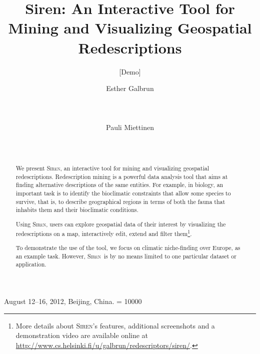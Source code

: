 \documentclass{sig-alternate}
\newcommand{\Siren}{\textsc{Siren}}
\begin{document}
 {August 12--16, 2012, Beijing, China.}
\widowpenalty = 10000
\setlength{\pdfpageheight}{11in}%
\setlength{\pdfpagewidth}{8.5in}%


\title{Siren: An Interactive Tool for Mining and Visualizing Geospatial Redescriptions}
\subtitle{[Demo]}

\author{
\alignauthor
Esther Galbrun\\
       \\
       \\
       \\
\alignauthor
Pauli Miettinen\\
       \\
       \\
}
 
\maketitle
\begin{abstract}
  We present \Siren, an interactive tool for mining and visualizing
  geospatial redescriptions.  Redescription mining is a powerful data
  analysis tool that aims at finding alternative descriptions of the
  same entities.  For example, in biology, an important task is to
  identify the bioclimatic constraints that allow some species to
  survive, that is, to describe geographical regions in terms of both
  the fauna that inhabits them and their bioclimatic conditions.
  
  Using \Siren, users can explore geospatial data of their interest by
  visualizing the redescriptions on a map, interactively edit, extend
  and filter them\footnote{More details about \Siren's features,
    additional screenshots and a demonstration video are available
    online at
    \url{http://www.cs.helsinki.fi/u/galbrun/redescriptors/siren/}.}.

  To demonstrate the use of the tool, we focus on climatic
  niche-finding over Europe, as an example task. However, \Siren\ is by
  no means limited to one particular dataset or application.
\end{abstract}
\end{document}

